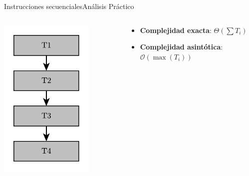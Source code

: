 \documentclass[spanish, c]{beamer}
\newcommand{\bigO}{\mathcal{O}}
\begin{document}
\begin{frame}{Instrucciones secuenciales}{Análisis Práctico}
    
    \begin{columns}
        \begin{column}{0.35\textwidth}
            \begin{center}
                \includegraphics[width=0.75\textwidth]{sequential-times.pdf}
            \end{center}
        \end{column}
        \begin{column}{0.65\textwidth}
            \hspace{-1in}
            \begin{itemize}
                \item \textbf{Complejidad exacta}: $\Theta(\sum T_i)$
                \item \textbf{Complejidad asintótica}: $\bigO(\max(T_i))$
            \end{itemize}


\end{column}
\end{columns}
\end{frame}
\end{document}
